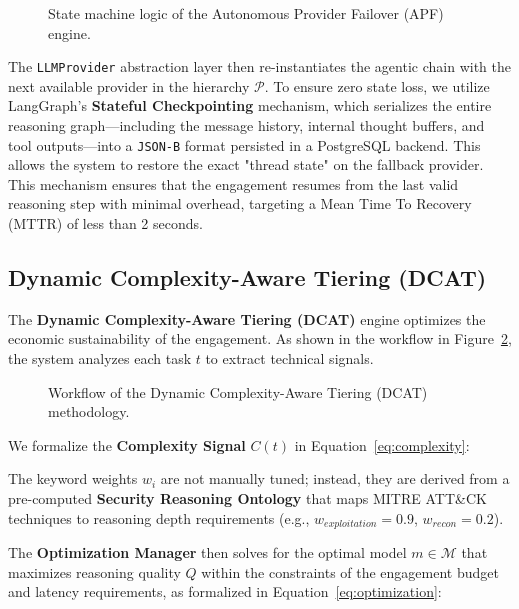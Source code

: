 \begin{figure}[!t]
    \centering
    \resizebox{\columnwidth}{!}{
        
    }
    \caption{State machine logic of the Autonomous Provider Failover (APF) engine.}
    \label{fig:apf_state}
\end{figure}

The \texttt{LLMProvider} abstraction layer then re-instantiates the agentic chain with the next available provider in the hierarchy $\mathcal{P}$. To ensure zero state loss, we utilize LangGraph's \textbf{Stateful Checkpointing} mechanism, which serializes the entire reasoning graph—including the message history, internal thought buffers, and tool outputs—into a \texttt{JSON-B} format persisted in a PostgreSQL backend. This allows the system to restore the exact "thread state" on the fallback provider. This mechanism ensures that the engagement resumes from the last valid reasoning step with minimal overhead, targeting a Mean Time To Recovery (MTTR) of less than 2 seconds.

\subsection{Dynamic Complexity-Aware Tiering (DCAT)}
\label{sec:dcat}
The \textbf{Dynamic Complexity-Aware Tiering (DCAT)} engine optimizes the economic sustainability of the engagement. As shown in the workflow in Figure~\ref{fig:dcat_flow}, the system analyzes each task $t$ to extract technical signals.

\begin{figure}[!t]
    \centering
    \resizebox{\columnwidth}{!}{
        
    }
    \caption{Workflow of the Dynamic Complexity-Aware Tiering (DCAT) methodology.}
    \label{fig:dcat_flow}
\end{figure}

We formalize the \textbf{Complexity Signal} $C(t)$ in Equation~\ref{eq:complexity}:


The keyword weights $w_i$ are not manually tuned; instead, they are derived from a pre-computed \textbf{Security Reasoning Ontology} that maps MITRE ATT\&CK techniques to reasoning depth requirements (e.g., $w_{exploitation} = 0.9$, $w_{recon} = 0.2$).

The \textbf{Optimization Manager} then solves for the optimal model $m \in \mathcal{M}$ that maximizes reasoning quality $Q$ within the constraints of the engagement budget and latency requirements, as formalized in Equation~\ref{eq:optimization}:


